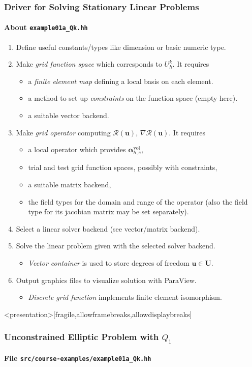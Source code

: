 \begin{frame}
\frametitle{Driver for Solving Stationary Linear Problems}
\framesubtitle{About \lstinline{example01a_Qk.hh}}
\begin{enumerate}
\item Define useful constants/types like dimension or basic numeric type.
\item Make \textit{grid function space} which corresponds to $U_h^k$. It requires
\begin{itemize}
\item a \textit{finite element map} defining a local basis on each element.
\item a method to set up \textit{constraints} on the function space (empty here).
\item a suitable vector backend.
\end{itemize}
\item Make \textit{grid operator} computing $\mathcal{R}(\mathbf{u})$, $\nabla\mathcal{R}(\mathbf{u})$. It requires
\begin{itemize}
\item a local operator which provides $\bm{\alpha}_{h,e}^{\text{vol}}$,
\item trial and test grid function spaces, possibly with constraints,
\item a suitable matrix backend,
\item the field types for the domain and range of the operator (also
  the field type for its jacobian matrix may be set separately).
\end{itemize}
\item Select a linear solver backend (see vector/matrix backend).
\item Solve the linear problem given with the selected solver backend.
\begin{itemize}
\item \textit{Vector container} is used to store degrees of freedom $\mathbf{u}\in\mathbf{U}$.
\end{itemize}
\item Output graphics files to visualize solution with ParaView.
\begin{itemize}
\item \textit{Discrete grid function} implements finite element isomorphism.
\end{itemize}
\end{enumerate}
\end{frame}


\begin{frame}<presentation>[fragile,allowframebreaks,allowdisplaybreaks]
\frametitle<presentation>{Unconstrained Elliptic Problem with $Q_1$}
\framesubtitle<presentation>{File \texttt{src/course-examples/example01a\_Qk.hh}}

\end{frame}


